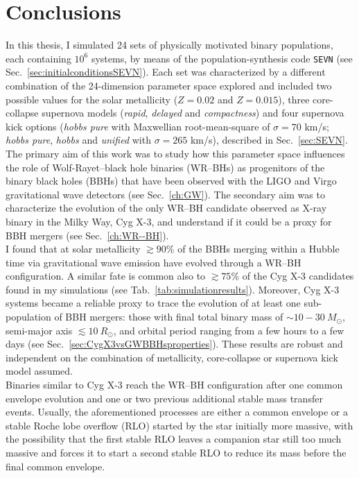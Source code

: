 \documentclass[a4paper,titlepage]{book}     	%
\newcommand{\sun}{\ensuremath{_\odot}}
\newcommand{\msun}{\ensuremath{M\sun}}
\newcommand{\rsun}{R_{\odot}}
\begin{document}
\chapter{Conclusions}
In this thesis, I simulated 24 sets of physically motivated binary populations, each containing $10^6$ systems, by means of the population-synthesis code \texttt{SEVN} (see Sec.\ \ref{sec:initialconditionsSEVN}). Each set was characterized by a different combination of the 24-dimension parameter space explored and  included two possible values for the solar metallicity ($Z=0.02$ and $Z=0.015$), three core-collapse supernova models (\emph{rapid}, \emph{delayed} and \emph{compactness}) and four supernova kick options (\emph{hobbs pure} with Maxwellian root-mean-square of $\sigma=70$ km/s; \emph{hobbs pure}, \emph{hobbs} and \emph{unified} with $\sigma=265$ km/s), described in Sec.\ \ref{sec:SEVN}. The primary aim of this work was to study how this parameter space influences the role of Wolf-Rayet--black hole binaries (WR--BHs) as progenitors of the binary black holes (BBHs) that have been observed with the LIGO and Virgo gravitational wave detectors (see Sec.\ \ref{ch:GW}). The secondary aim was to characterize the evolution of the only WR--BH candidate observed as X-ray binary in the Milky Way, Cyg X-3, and understand if it could be a proxy for BBH mergers (see Sec.\ \ref{ch:WR--BH}). \\

I found that at solar metallicity $\gtrsim 90 \%$ of the BBHs merging within a Hubble time via gravitational wave emission have evolved through a WR--BH configuration. A similar fate is common also to $\gtrsim 75 \%$ of the Cyg X-3 candidates found in my simulations (see Tab.\ \ref{tab:simulationresults}). Moreover, Cyg X-3 systems became a reliable proxy to trace the evolution of at least one sub-population of BBH mergers: those with final total binary mass of $\sim 10-30~\msun$, semi-major axis $\lesssim 10~\rsun$, and orbital period ranging from a few hours to a few days (see Sec.\ \ref{sec:CygX3vsGWBBHsproperties}). These results are robust and independent on the combination of metallicity, core-collapse or supernova kick model assumed. \\

Binaries similar to Cyg X-3 reach the WR--BH configuration after one common envelope evolution and one or two previous additional stable mass transfer events. Usually, the aforementioned processes are either a common envelope or a stable Roche lobe overflow (RLO) started by the star initially more massive, with the possibility that the first stable RLO leaves a companion star still too much massive and forces it to start a second stable RLO to reduce its mass before the final common envelope. 
\end{document}
